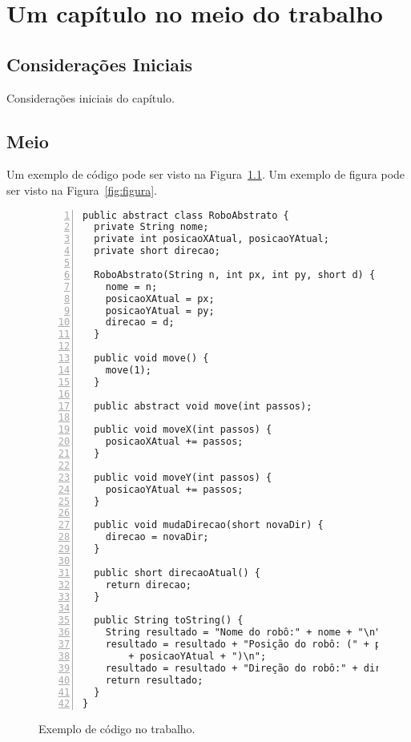 \chapter{Um capítulo no meio do trabalho}
\label{cap:meio}

\section{Considerações Iniciais}

Considerações iniciais do capítulo.

\section{Meio}

Um exemplo de código pode ser visto na Figura~\ref{fig:codigo}. Um exemplo de figura pode ser visto na Figura~\ref{fig:figura}.

\begin{figure}[!htb]

\begin{center}
\scriptsize
\begin{lstlisting}[numbers=left]
public abstract class RoboAbstrato {
  private String nome;
  private int posicaoXAtual, posicaoYAtual;
  private short direcao;

  RoboAbstrato(String n, int px, int py, short d) {
    nome = n;
    posicaoXAtual = px;
    posicaoYAtual = py;
    direcao = d;
  }

  public void move() {
    move(1);
  }

  public abstract void move(int passos);

  public void moveX(int passos) {
    posicaoXAtual += passos;
  }

  public void moveY(int passos) {
    posicaoYAtual += passos;
  }

  public void mudaDirecao(short novaDir) {
    direcao = novaDir;
  }

  public short direcaoAtual() {
    return direcao;
  }

  public String toString() {
    String resultado = "Nome do robô:" + nome + "\n";
    resultado = resultado + "Posição do robô: (" + posicaoXAtual + ","
        + posicaoYAtual + ")\n";
    resultado = resultado + "Direção do robô:" + direcao;
    return resultado;
  }
}
\end{lstlisting}
\end{center}
\caption{Exemplo de código no trabalho.\label{fig:codigo}}
\end{figure}

